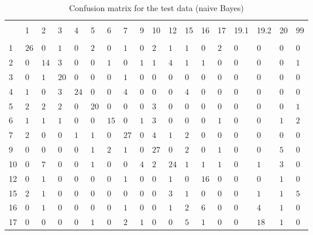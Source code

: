 
\begin{table}[!htbp] \centering 
  \caption{Confusion matrix for the test data (naive Bayes)} 
  \label{tab:confusion-mat-nb} 
\begin{tabularx}{\textwidth}{XXXXXXXXXXXXXXXXXX} 
\\[-1.8ex]\hline 
\hline \\[-1.8ex] 
 & 1 & 2 & 3 & 4 & 5 & 6 & 7 & 9 & 10 & 12 & 15 & 16 & 17 & 19.1 & 19.2 & 20 & 99 \\ 
\hline \\[-1.8ex] 
1 & $26$ & $0$ & $1$ & $0$ & $2$ & $0$ & $1$ & $0$ & $2$ & $1$ & $1$ & $0$ & $2$ & $0$ & $0$ & $0$ & $0$ \\ 
2 & $0$ & $14$ & $3$ & $0$ & $0$ & $1$ & $0$ & $1$ & $1$ & $4$ & $1$ & $1$ & $0$ & $0$ & $0$ & $0$ & $1$ \\ 
3 & $0$ & $1$ & $20$ & $0$ & $0$ & $0$ & $1$ & $0$ & $0$ & $0$ & $0$ & $0$ & $0$ & $0$ & $0$ & $0$ & $0$ \\ 
4 & $1$ & $0$ & $3$ & $24$ & $0$ & $0$ & $4$ & $0$ & $0$ & $0$ & $4$ & $0$ & $0$ & $0$ & $0$ & $0$ & $0$ \\ 
5 & $2$ & $2$ & $2$ & $0$ & $20$ & $0$ & $0$ & $0$ & $3$ & $0$ & $0$ & $0$ & $0$ & $0$ & $0$ & $0$ & $1$ \\ 
6 & $1$ & $1$ & $1$ & $0$ & $0$ & $15$ & $0$ & $1$ & $3$ & $0$ & $0$ & $0$ & $1$ & $0$ & $0$ & $1$ & $2$ \\ 
7 & $2$ & $0$ & $0$ & $1$ & $1$ & $0$ & $27$ & $0$ & $4$ & $1$ & $2$ & $0$ & $0$ & $0$ & $0$ & $0$ & $0$ \\ 
9 & $0$ & $0$ & $0$ & $0$ & $1$ & $2$ & $1$ & $0$ & $27$ & $0$ & $2$ & $0$ & $1$ & $0$ & $0$ & $5$ & $0$ \\ 
10 & $0$ & $7$ & $0$ & $0$ & $1$ & $0$ & $0$ & $4$ & $2$ & $24$ & $1$ & $1$ & $1$ & $0$ & $1$ & $3$ & $0$ \\ 
12 & $0$ & $1$ & $0$ & $0$ & $0$ & $0$ & $1$ & $0$ & $0$ & $1$ & $0$ & $16$ & $0$ & $0$ & $0$ & $1$ & $0$ \\ 
15 & $2$ & $1$ & $0$ & $0$ & $0$ & $0$ & $0$ & $0$ & $0$ & $3$ & $1$ & $0$ & $0$ & $0$ & $1$ & $1$ & $5$ \\ 
16 & $0$ & $1$ & $0$ & $0$ & $0$ & $0$ & $1$ & $0$ & $0$ & $1$ & $2$ & $6$ & $0$ & $0$ & $4$ & $1$ & $0$ \\ 
17 & $0$ & $0$ & $0$ & $0$ & $1$ & $0$ & $2$ & $1$ & $0$ & $0$ & $5$ & $1$ & $0$ & $0$ & $18$ & $1$ & $0$ \\ 

\end{tabularx}
\end{table}
